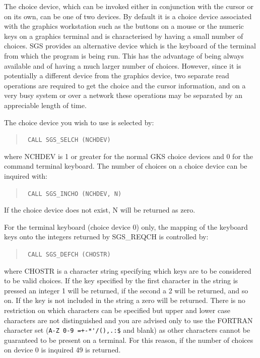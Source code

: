 \documentclass[11pt]{article}
\newcommand{\htmlref}[2]{#1}
\begin{document}
The choice device, which can be invoked either in conjunction with the cursor 
or on its own, can be one of two devices.  By
default it is a choice device 
associated with the graphics workstation such as the  buttons on 
a mouse or the numeric keys on a graphics terminal and is characterised by 
having a small number of choices.  SGS provides an 
alternative device which is the keyboard of the terminal from which the 
program is being run.  This
has the advantage of being always available
and of having a much larger number of
choices.  However, since
it is potentially a different device from the graphics device, two separate 
read operations are required to get the choice and the cursor 
information,
and 
on a very busy system or over a network these operations may be separated by 
an appreciable length of time.

The choice device you wish to use is selected by:
\begin{quote}{\tt
    CALL \htmlref{SGS\_SELCH}{SGS_SELCH} (NCHDEV)}
\end{quote}
where NCHDEV is 1 or greater for the normal GKS choice devices and 0 for the 
command terminal keyboard.  
The number of choices on a choice device can be inquired with:
\begin{quote}{\tt
    CALL \htmlref{SGS\_INCHO}{SGS_INCHO} (NCHDEV, N)}
\end{quote}
If the choice device does not exist, N will be returned as zero.

For the terminal keyboard (choice device
0) only, the mapping of the keyboard keys onto the integers returned by 
SGS\_REQCH is controlled by:
\begin{quote}{\tt
    CALL \htmlref{SGS\_DEFCH}{SGS_DEFCH} (CHOSTR)}
\end{quote}
where CHOSTR is a character string specifying which keys are to be considered 
to be valid choices.  If the key specified by the first character in 
the string is pressed an
integer 1 will be 
returned, if the second a 2 will be returned,
and so on.  If the key is not included in the string 
a zero will be returned.  There is no restriction on which characters can be 
specified but upper and lower case characters are not distinguished and you 
are advised only to use the FORTRAN character set (\verb#A-Z 0-9 =+-*'/(),.:$#
and blank) as other characters cannot be guaranteed to be present on a
terminal.  For this reason, if
the number of choices on device 0 is inquired 49 is 
returned.
\end{document}
